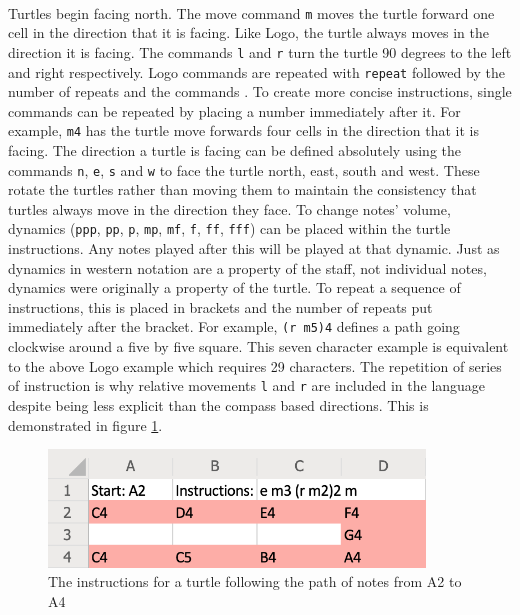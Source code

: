 \paragraph{} Turtles begin facing north. The move command \texttt{m} moves the turtle forward one cell in the direction that it is facing. Like Logo, the turtle always moves in the direction it is facing. The commands \texttt{l} and \texttt{r} turn the turtle 90 degrees to the left and right respectively. Logo commands are repeated with \texttt{repeat} followed by the number of repeats and the commands \cite{goldman:turtle}. To create more concise instructions, single commands can be repeated by placing a number immediately after it. For example, \texttt{m4} has the turtle move forwards four cells in the direction that it is facing. The direction a turtle is facing can be defined absolutely using the commands \texttt{n}, \texttt{e}, \texttt{s} and \texttt{w} to face the turtle north, east, south and west. These rotate the turtles rather than moving them to maintain the consistency that turtles always move in the direction they face. To change notes' volume, dynamics (\texttt{ppp}, \texttt{pp}, \texttt{p}, \texttt{mp}, \texttt{mf}, \texttt{f}, \texttt{ff}, \texttt{fff}) can be placed within the turtle instructions. Any notes played after this will be played at that dynamic. Just as dynamics in western notation are a property of the staff, not individual notes, dynamics were originally a property of the turtle. To repeat a sequence of instructions, this is placed in brackets and the number of repeats put immediately after the bracket. For example, \texttt{(r m5)4}  defines a path going clockwise around a five by five square. This seven character example is equivalent to the above Logo example which requires 29 characters. The repetition of series of instruction is why relative movements \texttt{l} and \texttt{r} are included in the language despite being less explicit than the compass based directions. This is demonstrated in figure \ref{prep:language1}.

\begin{figure}[ht]
  \centerline{\includegraphics[width=100mm]{figs/diss1.png}}
\caption{The instructions for a turtle following the path of notes from A2 to A4}
\label{prep:language1}
\end{figure}
\vspace{-20pt}

